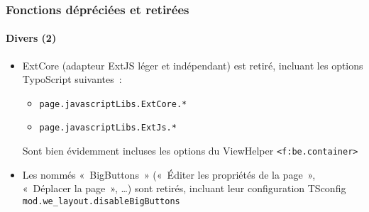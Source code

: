 \begin{frame}[fragile]
	\frametitle{Fonctions dépréciées et retirées}
	\framesubtitle{Divers (2)}

	\begin{itemize}

		\item ExtCore (adapteur ExtJS léger et indépendant) est retiré, incluant les options TypoScript suivantes~:

			\begin{itemize}
				\item \texttt{page.javascriptLibs.ExtCore.*}
				\item \texttt{page.javascriptLibs.ExtJs.*}
			\end{itemize}

			Sont bien évidemment incluses les options du ViewHelper \texttt{<f:be.container>}

		\item Les nommés «~BigButtons~» («~Éditer les propriétés de la page~», «~Déplacer la page~», …)
			sont retirés, incluant leur configuration TSconfig \texttt{mod.we\_layout.disableBigButtons}

	\end{itemize}

\end{frame}


